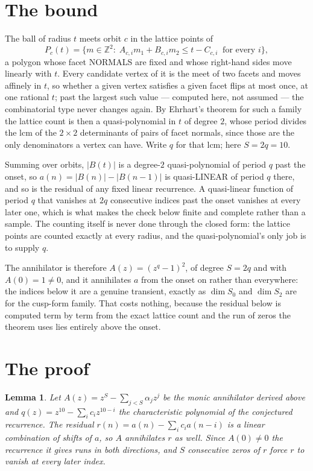 \documentclass[11pt,a4paper]{article}
\theoremstyle{plain}
\newtheorem{lemma}[theorem]{Lemma}
\theoremstyle{definition}
\begin{document}
\section{The bound}

The ball of radius $t$ meets orbit $c$ in the lattice points of
\[
P_c(t)=\{m\in\mathbb{Z}^2:\;A_{c,i}m_1+B_{c,i}m_2\le t-C_{c,i}\ \text{ for every } i\},
\]
a polygon whose facet NORMALS are fixed and whose right-hand sides move linearly with $t$.
Every candidate vertex of it is the meet of two facets and moves affinely in $t$, so whether a
given vertex satisfies a given facet flips at most once, at one rational $t$; past the largest
such value --- computed here, not assumed --- the combinatorial type never changes again. By
Ehrhart's theorem for such a family the lattice count is then a quasi-polynomial in $t$ of
degree $2$, whose period divides the lcm of the $2\times2$ determinants of pairs of facet
normals, since those are the only denominators a vertex can have. Write $q$ for that lcm;
here $S=2q=10$.

Summing over orbits, $|B(t)|$ is a degree-$2$ quasi-polynomial of period $q$ past the onset,
so $a(n)=|B(n)|-|B(n-1)|$ is quasi-LINEAR of period $q$ there, and so is the residual of any
fixed linear recurrence. A quasi-linear function of period $q$ that vanishes at $2q$
consecutive indices past the onset vanishes at every later one, which is what makes the check
below finite and complete rather than a sample. The counting itself is never done through the
closed form: the lattice points are counted exactly at every radius, and the quasi-polynomial's
only job is to supply $q$.

The annihilator is therefore $A(z)=(z^{q}-1)^2$, of degree $S=2q$ and with $A(0)=1\ne0$, and
it annihilates $a$ from the onset on rather than everywhere: the indices below it are a
genuine transient, exactly as $\dim S_0$ and $\dim S_2$ are for the cusp-form family. That
costs nothing, because the residual below is computed term by term from the exact lattice
count and the run of zeros the theorem uses lies entirely above the onset.

\section{The proof}

\begin{lemma}\label{lem:crit}
Let $A(z)=z^S-\sum_{j<S}\alpha_jz^{j}$ be the monic annihilator derived above and
$q(z)=z^{10}-\sum_ic_iz^{10-i}$ the characteristic polynomial of the conjectured
recurrence. The residual $r(n)=a(n)-\sum_ic_ia(n-i)$ is a linear combination of shifts of $a$,
so $A$ annihilates $r$ as well. Since $A(0)\ne0$ the recurrence it gives runs in both
directions, and $S$ consecutive zeros of $r$ force $r$ to vanish at every later index.
\end{lemma}
\end{document}

